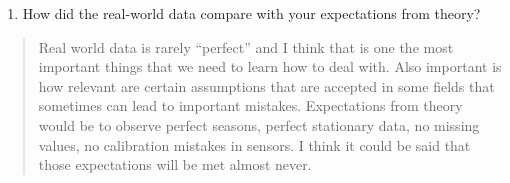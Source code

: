 \documentclass[]{article}
\providecommand{\tightlist}{%
  \setlength{\itemsep}{0pt}\setlength{\parskip}{0pt}}
\begin{document}
\begin{enumerate}
\def\labelenumi{\arabic{enumi}.}
\setcounter{enumi}{15}
\tightlist
\item
  How did the real-world data compare with your expectations from
  theory?
\end{enumerate}

\begin{quote}
Real world data is rarely ``perfect'' and I think that is one the most
important things that we need to learn how to deal with. Also important
is how relevant are certain assumptions that are accepted in some fields
that sometimes can lead to important mistakes. Expectations from theory
would be to observe perfect seasons, perfect stationary data, no missing
values, no calibration mistakes in sensors. I think it could be said
that those expectations will be met almost never.
\end{quote}
\end{document}
